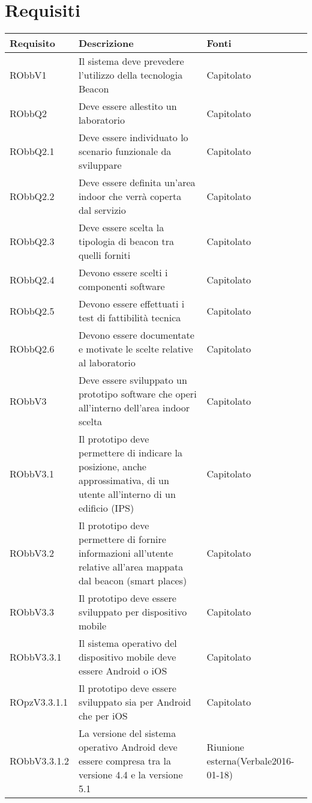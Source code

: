 \documentclass[../AnalisiDeiRequisiti.tex]{subfiles}
\begin{document}
\section{Requisiti}
\begin{longtabu} to \textwidth {X X[2] X}
\toprule
\textbf{Requisito} & \textbf{Descrizione} & \textbf{Fonti}\\
\midrule
\endhead
{}
\midrule 
RObbV1 & Il sistema deve prevedere l'utilizzo della tecnologia Beacon & Capitolato \\ 
\midrule 
RObbQ2 & Deve essere allestito un laboratorio & Capitolato \\ 
\midrule 
RObbQ2.1 & Deve essere individuato lo scenario funzionale da sviluppare & Capitolato \\ 
\midrule 
RObbQ2.2 & Deve essere definita un'area indoor che verrà coperta dal servizio & Capitolato \\ 
\midrule 
RObbQ2.3 & Deve essere scelta la tipologia di beacon tra quelli forniti & Capitolato \\ 
\midrule 
RObbQ2.4 & Devono essere scelti i componenti software & Capitolato \\ 
\midrule 
RObbQ2.5 & Devono essere effettuati i test di fattibilità tecnica & Capitolato \\ 
\midrule 
RObbQ2.6 & Devono essere documentate e motivate le scelte relative al laboratorio & Capitolato \\ 
\midrule 
RObbV3 & Deve essere sviluppato un prototipo software che operi all'interno dell'area indoor scelta & Capitolato \\ 
\midrule 
RObbV3.1 & Il prototipo deve permettere di indicare la posizione, anche approssimativa, di un utente all'interno di un edificio (IPS) & Capitolato \\ 
\midrule 
RObbV3.2 & Il prototipo deve permettere di fornire informazioni all'utente relative all'area mappata dal beacon (smart places) & Capitolato \\ 
\midrule 
RObbV3.3 & Il prototipo deve essere sviluppato per dispositivo mobile & Capitolato \\ 
\midrule 
RObbV3.3.1 & Il sistema operativo del dispositivo mobile deve essere Android o iOS & Capitolato \\ 
\midrule 
ROpzV3.3.1.1 & Il prototipo deve essere sviluppato sia per Android che per iOS & Capitolato \\ 
\midrule 
RObbV3.3.1.2 & La versione del sistema operativo Android deve essere compresa tra la versione 4.4 e la versione 5.1 & Riunione esterna(Verbale2016-01-18) \\ 

\end{longtabu}
\end{document}
